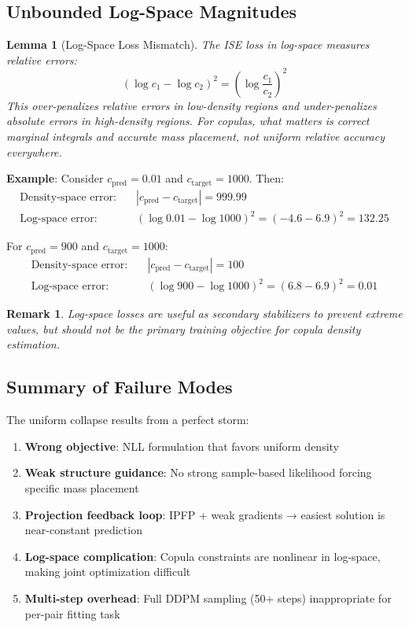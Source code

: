 \documentclass[11pt]{article}
\newtheorem{lemma}{Lemma}
\newtheorem{remark}{Remark}
\begin{document}
\subsection{Unbounded Log-Space Magnitudes}

\begin{lemma}[Log-Space Loss Mismatch]
The ISE loss in log-space measures relative errors:
\begin{equation}
(\log c_1 - \log c_2)^2 = \left(\log \frac{c_1}{c_2}\right)^2
\end{equation}
This over-penalizes relative errors in low-density regions and under-penalizes absolute errors in high-density regions. For copulas, what matters is correct marginal integrals and accurate mass placement, not uniform relative accuracy everywhere.
\end{lemma}

\textbf{Example}: Consider $c_{\text{pred}} = 0.01$ and $c_{\text{target}} = 1000$. Then:
\begin{align}
\text{Density-space error:} \quad &|c_{\text{pred}} - c_{\text{target}}| = 999.99 \\
\text{Log-space error:} \quad &(\log 0.01 - \log 1000)^2 = (-4.6 - 6.9)^2 = 132.25
\end{align}

For $c_{\text{pred}} = 900$ and $c_{\text{target}} = 1000$:
\begin{align}
\text{Density-space error:} \quad &|c_{\text{pred}} - c_{\text{target}}| = 100 \\
\text{Log-space error:} \quad &(\log 900 - \log 1000)^2 = (6.8 - 6.9)^2 = 0.01
\end{align}

\begin{remark}
Log-space losses are useful as secondary stabilizers to prevent extreme values, but should not be the primary training objective for copula density estimation.
\end{remark}

\subsection{Summary of Failure Modes}

The uniform collapse results from a perfect storm:
\begin{enumerate}
    \item \textbf{Wrong objective}: NLL formulation that favors uniform density
    \item \textbf{Weak structure guidance}: No strong sample-based likelihood forcing specific mass placement
    \item \textbf{Projection feedback loop}: IPFP + weak gradients → easiest solution is near-constant prediction
    \item \textbf{Log-space complication}: Copula constraints are nonlinear in log-space, making joint optimization difficult
    \item \textbf{Multi-step overhead}: Full DDPM sampling (50+ steps) inappropriate for per-pair fitting task
\end{enumerate}
\end{document}

